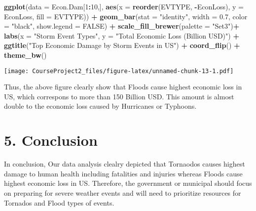 \documentclass[]{article}
\newenvironment{Shaded}{\begin{snugshade}}{\end{snugshade}}
\newcommand{\KeywordTok}[1]{\textcolor[rgb]{0.13,0.29,0.53}{\textbf{#1}}}
\newcommand{\DataTypeTok}[1]{\textcolor[rgb]{0.13,0.29,0.53}{#1}}
\newcommand{\DecValTok}[1]{\textcolor[rgb]{0.00,0.00,0.81}{#1}}
\newcommand{\FloatTok}[1]{\textcolor[rgb]{0.00,0.00,0.81}{#1}}
\newcommand{\StringTok}[1]{\textcolor[rgb]{0.31,0.60,0.02}{#1}}
\newcommand{\OtherTok}[1]{\textcolor[rgb]{0.56,0.35,0.01}{#1}}
\newcommand{\OperatorTok}[1]{\textcolor[rgb]{0.81,0.36,0.00}{\textbf{#1}}}
\newcommand{\NormalTok}[1]{#1}
\begin{document}
\begin{Shaded}
\begin{Highlighting}[]
\KeywordTok{ggplot}\NormalTok{(}\DataTypeTok{data =}\NormalTok{ Econ.Dam[}\DecValTok{1}\OperatorTok{:}\DecValTok{10}\NormalTok{,], }\KeywordTok{aes}\NormalTok{(}\DataTypeTok{x =} \KeywordTok{reorder}\NormalTok{(EVTYPE, }\OperatorTok{-}\NormalTok{EconLoss), }\DataTypeTok{y =}\NormalTok{ EconLoss, }\DataTypeTok{fill =}\NormalTok{ EVTYPE)) }\OperatorTok{+}\StringTok{ }
\StringTok{      }\KeywordTok{geom_bar}\NormalTok{(}\DataTypeTok{stat =} \StringTok{"identity"}\NormalTok{, }\DataTypeTok{width =} \FloatTok{0.7}\NormalTok{, }\DataTypeTok{color =} \StringTok{"black"}\NormalTok{, }\DataTypeTok{show.legend =} \OtherTok{FALSE}\NormalTok{) }\OperatorTok{+}\StringTok{ }
\StringTok{      }\KeywordTok{scale_fill_brewer}\NormalTok{(}\DataTypeTok{palette =} \StringTok{"Set3"}\NormalTok{)}\OperatorTok{+}
\StringTok{      }\KeywordTok{labs}\NormalTok{(}\DataTypeTok{x =} \StringTok{"Storm Event Types"}\NormalTok{, }\DataTypeTok{y =} \StringTok{"Total Economic Loss (Billion USD)"}\NormalTok{) }\OperatorTok{+}\StringTok{ }
\StringTok{      }\KeywordTok{ggtitle}\NormalTok{(}\StringTok{"Top Economic Damage by Storm Events in US"}\NormalTok{) }\OperatorTok{+}\StringTok{ }
\StringTok{      }\KeywordTok{coord_flip}\NormalTok{() }\OperatorTok{+}
\StringTok{      }\KeywordTok{theme_bw}\NormalTok{()}
\end{Highlighting}
\end{Shaded}

\texttt{[image: CourseProject2\_files/figure-latex/unnamed-chunk-13-1.pdf]}

Thus, the above figure clearly show that Floods cause highest economic
loss in US, which correspons to more than 150 Billion USD. This amount
is almost double to the economic loss caused by Hurricanes or Typhoons.

\section{5. Conclusion}\label{conclusion}

In conclusion, Our data analysis clealry depicted that Tornaodos causes
highest damage to human health including fatalities and injuries whereas
Floods cause highest economic loss in US. Therefore, the government or
municipal should focus on preparing for severe weather events and will
need to prioritize resources for Tornados and Flood types of events.
\end{document}
